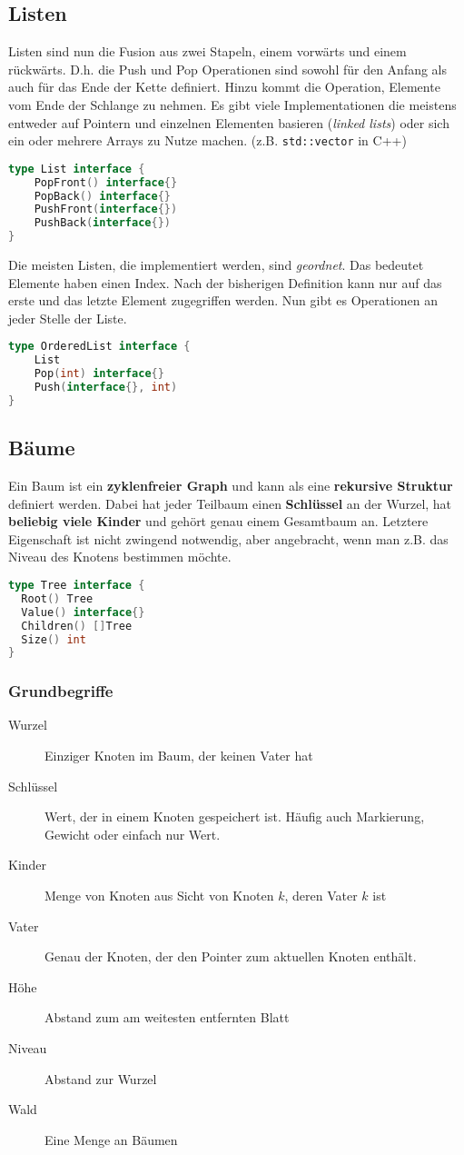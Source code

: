 \documentclass{article}
\begin{document}
\subsection{Listen}
Listen sind nun die Fusion aus zwei Stapeln, einem vorwärts und einem rückwärts. D.h. die Push und Pop Operationen sind sowohl für den Anfang als auch für das Ende der Kette definiert. Hinzu kommt die Operation, Elemente vom Ende der Schlange zu nehmen. Es gibt viele Implementationen die meistens entweder auf Pointern und einzelnen Elementen basieren (\emph{linked lists}) oder sich ein oder mehrere Arrays zu Nutze machen. (z.B. \texttt{std::vector} in C++)
\begin{lstlisting}[language=go]
type List interface {
    PopFront() interface{}
    PopBack() interface{}
    PushFront(interface{}) 
    PushBack(interface{}) 
}
\end{lstlisting}
Die meisten Listen, die implementiert werden, sind \emph{geordnet}. Das bedeutet Elemente haben einen Index. Nach der bisherigen Definition kann nur auf das erste und das letzte Element zugegriffen werden. Nun gibt es Operationen an jeder Stelle der Liste.
\begin{lstlisting}[language=go]
type OrderedList interface {
    List
    Pop(int) interface{}
    Push(interface{}, int)
}
\end{lstlisting}
\subsection{Bäume}
Ein Baum ist ein \textbf{zyklenfreier Graph} und kann als eine \textbf{rekursive Struktur} definiert werden. Dabei hat jeder Teilbaum einen \textbf{Schlüssel} an der Wurzel, hat \textbf{beliebig viele Kinder} und gehört genau einem Gesamtbaum an. Letztere Eigenschaft ist nicht zwingend notwendig, aber angebracht, wenn man z.B. das Niveau des Knotens bestimmen möchte.
\begin{lstlisting}[language=Go]
type Tree interface {
  Root() Tree
  Value() interface{}
  Children() []Tree
  Size() int
}
\end{lstlisting}
\subsubsection{Grundbegriffe}
\begin{description}
    \item[Wurzel] Einziger Knoten im Baum, der keinen Vater hat
    \item[Schlüssel] Wert, der in einem Knoten gespeichert ist. Häufig auch Markierung, Gewicht oder einfach nur Wert.
    \item[Kinder] Menge von Knoten aus Sicht von Knoten $k$, deren Vater $k$ ist  
    \item[Vater] Genau der Knoten, der den Pointer zum aktuellen Knoten enthält. 
    \item[Höhe] Abstand zum am weitesten entfernten Blatt
    \item[Niveau] Abstand zur Wurzel  
    \item[Wald] Eine Menge an Bäumen 
\end{description}
\end{document}
